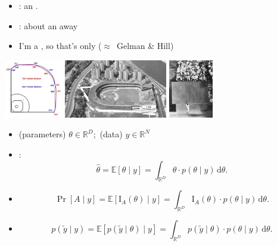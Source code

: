 \documentclass[9pt]{report}
\newcommand{\expect}[1]{\mathbb{E}\!\left[ #1 \right]}
\newcommand{\reals}{\mathbb{R}}
\begin{document}
  
\begin{itemize}
  \item {}: an .
  \item {}: about an  away
  \item I'm a , so that's only   \hfill   ($\approx$\ Gelman \& Hill) 
  \end{itemize}
\vfill
\begin{center}
  \spc
  \includegraphics[height=1in]{img/yankee-stadium.jpeg}
  \hfill
  \spc\includegraphics[height=1in]{img/polo-grounds.jpeg}
  \hfill
  \spc\includegraphics[height=1in]{img/willie-mays.jpeg}
\end{center}

\sld{}
\vfill 
\begin{center}
\Huge {}
\end{center}
\vfill 
\vfill 

\begin{itemize}
\item {} (parameters) $\theta \in \reals^D;$ \quad 
   (data) $y \in \reals^N$
\item {}: 
$$
\widehat{\theta}
= \expect{\theta \mid y}
= \int_{\reals^D} \theta \cdot p(\theta \mid y) \, \textrm{d}\theta. 
$$
\item {}
$$
\Pr[A \mid y]
= \expect{\textrm{I}_{A}(\theta) \mid y}
= \int_{\reals^D} \textrm{I}_{A}(\theta) \cdot p(\theta \mid y) \, \textrm{d}\theta. 
$$
\item {}
$$
p(\tilde{y} \mid y) 
= \expect{p(\tilde y \mid \theta) \mid y}
= \int_{\mathbb{R}^D} p(\tilde{y} \mid \theta) \cdot p(\theta \mid 
  y) \, \textrm{d}\theta. 
$$
\end{itemize}
\end{document}

